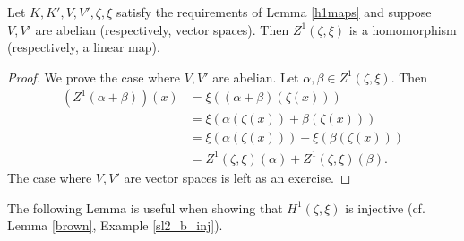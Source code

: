 \begin{corollary} \label{zlinear} Let $K,K',V,V',\zeta,\xi$ satisfy the requirements of Lemma \ref{h1maps} and suppose $V,V'$ are abelian (respectively, vector spaces). Then $Z^1(\zeta, \xi)$ is a homomorphism (respectively, a linear map).
\end{corollary}
\begin{proof}
	We prove the case where $V, V'$ are abelian. Let $\alpha, \beta \in Z^1(\zeta, \xi)$. Then
\begin{align*}
	\left(Z^1(\alpha + \beta)\right)(x) &= \xi\left((\alpha + \beta)(\zeta(x))\right) \\
		&= \xi\left(\alpha(\zeta(x)) + \beta(\zeta(x))\right) \\
		&= \xi\left(\alpha(\zeta(x))\right) + \xi\left(\beta(\zeta(x))\right) \\
		&= Z^1(\zeta, \xi)(\alpha) + Z^1(\zeta, \xi)(\beta).
\end{align*}
The case where $V, V'$ are vector spaces is left as an exercise.
\end{proof}

The following Lemma is useful when showing that $H^1(\zeta, \xi)$ is injective (cf. Lemma \ref{brown}, Example \ref{sl2_b_inj}).

